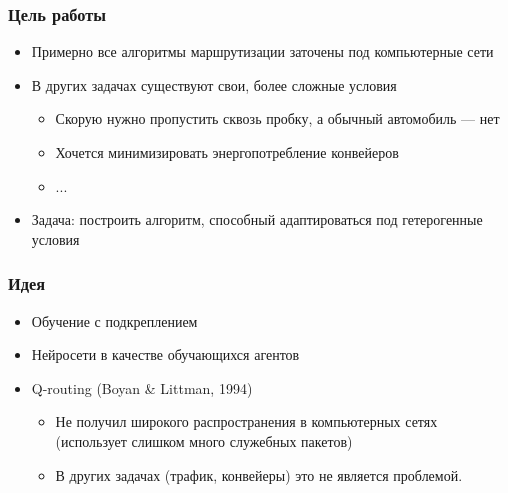 \documentclass{beamer}
\begin{document}

\begin{frame}
  \frametitle{Цель работы}
  \begin{itemize}
  \item Примерно все алгоритмы маршрутизации заточены под компьютерные сети
  \item В других задачах существуют свои, более сложные условия
    \begin{itemize}
    \item Скорую нужно пропустить сквозь пробку, а обычный автомобиль --- нет
    \item Хочется минимизировать энергопотребление конвейеров
    \item ...
    \end{itemize}
  \item Задача: построить алгоритм, способный адаптироваться под гетерогенные условия
  \end{itemize}
\end{frame}




\begin{frame}
  \frametitle{Идея}
  \begin{itemize}
  \item Обучение с подкреплением
  \item Нейросети в качестве обучающихся агентов
  \item Q-routing (Boyan \& Littman, 1994)
    \begin{itemize}
    \item Не получил широкого распространения в компьютерных сетях (использует
      слишком много служебных пакетов)
    \item В других задачах (трафик, конвейеры) это не является проблемой.
    \end{itemize}
  \end{itemize}
\end{frame}

\end{document}
